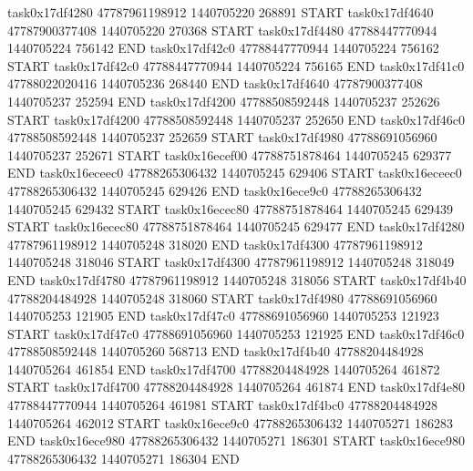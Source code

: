 task0x17df4280 47787961198912          1440705220               268891  START
task0x17df4640 47787900377408          1440705220               270368  START
task0x17df4480 47788447770944          1440705224               756142  END
task0x17df42c0 47788447770944          1440705224               756162  START
task0x17df42c0 47788447770944          1440705224               756165  END
task0x17df41c0 47788022020416          1440705236               268440  END
task0x17df4640 47787900377408          1440705237               252594  END
task0x17df4200 47788508592448          1440705237               252626  START
task0x17df4200 47788508592448          1440705237               252650  END
task0x17df46c0 47788508592448          1440705237               252659  START
task0x17df4980 47788691056960          1440705237               252671  START
task0x16ecef00 47788751878464          1440705245               629377  END
task0x16eceec0 47788265306432          1440705245               629406  START
task0x16eceec0 47788265306432          1440705245               629426  END
task0x16ece9c0 47788265306432          1440705245               629432  START
task0x16ecec80 47788751878464          1440705245               629439  START
task0x16ecec80 47788751878464          1440705245               629477  END
task0x17df4280 47787961198912          1440705248               318020  END
task0x17df4300 47787961198912          1440705248               318046  START
task0x17df4300 47787961198912          1440705248               318049  END
task0x17df4780 47787961198912          1440705248               318056  START
task0x17df4b40 47788204484928          1440705248               318060  START
task0x17df4980 47788691056960          1440705253               121905  END
task0x17df47c0 47788691056960          1440705253               121923  START
task0x17df47c0 47788691056960          1440705253               121925  END
task0x17df46c0 47788508592448          1440705260               568713  END
task0x17df4b40 47788204484928          1440705264               461854  END
task0x17df4700 47788204484928          1440705264               461872  START
task0x17df4700 47788204484928          1440705264               461874  END
task0x17df4e80 47788447770944          1440705264               461981  START
task0x17df4bc0 47788204484928          1440705264               462012  START
task0x16ece9c0 47788265306432          1440705271               186283  END
task0x16ece980 47788265306432          1440705271               186301  START
task0x16ece980 47788265306432          1440705271               186304  END
